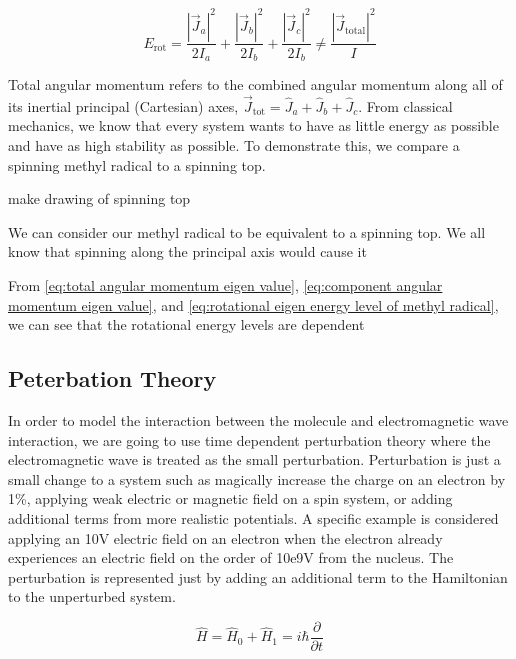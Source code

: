 \documentclass[11pt,a4paper]{book}
\begin{document}
			\begin{equation}
				E_{\text{rot}} =  \dfrac{|\vec{J}_a|^2}{2I_a} + \dfrac{|\vec{J}_b|^2}{2I_b} +\dfrac{|\vec{J}_c|^2}{2I_b} \neq \dfrac {|\vec{J}_\text{total}|^2}{I}
			\end{equation}
			
			Total angular momentum refers to the combined angular momentum along all of its inertial principal (Cartesian) axes, $\vec{J}_{\text{tot}} = \hat{J}_a + \hat{J}_b +\hat{J}_c$. From classical mechanics, we know that every system wants to have as little energy as possible and have as high stability as possible. To demonstrate this, we compare a spinning methyl radical to a spinning top.
			
			make drawing of spinning top
			
			We can consider our methyl radical to be equivalent to a spinning top. We all know that  spinning along the principal axis would cause it 
			
			From \autoref{eq:total angular momentum eigen value}, \autoref{eq:component angular momentum eigen value}, and \autoref{eq:rotational eigen energy level of methyl radical}, we can see that the rotational energy levels are dependent  
		\subsection{Peterbation Theory}
			\label{subsec:Peterbation Theory}
			In order to model the interaction between the molecule and electromagnetic wave interaction, we are going to use time dependent perturbation theory where the electromagnetic wave is treated as the small perturbation. Perturbation is just a small change to a system such as magically increase the charge on an electron by 1\%, applying weak electric or magnetic field on a spin system, or adding additional terms from more realistic potentials. A specific example is considered applying an 10V electric field on an electron when the electron already experiences an electric field on the order of 10e9V from the nucleus. The perturbation is represented just by adding an additional term to the Hamiltonian to the unperturbed system.
			
			\begin{equation}
				\label{eq:time dependent pertubation hamiltonian}
				\hat{H} = \hat{H}_0 + \hat{H}_1 =i\hbar \dfrac{\partial}{\partial t}
			\end{equation}
			
\end{document}
